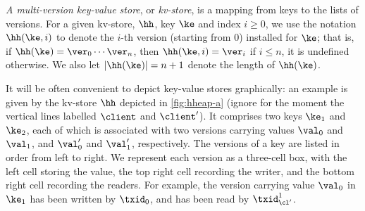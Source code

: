 \emph{A multi-version key-value store}, or \emph{kv-store}, 
is a mapping from keys to the lists of versions. 
For a given kv-store, $\hh$, key $\ke$ and index $i \geq 0$, we use the notation $\hh(\ke, i)$ 
to denote the $i$-th version (starting from $0$) installed for $\ke$; that is, if $\hh(\ke) = \ver_0 \cdots\ver_{n}$, then 
$\hh(\ke, i) = \ver_{i}$ if $i \leq n$, it is undefined otherwise. We also let $\lvert \hh(\ke) \rvert = n +1 $ denote 
the length of $\hh(\ke)$.

It will be often convenient to depict key-value stores graphically: an 
example is given by the kv-store $\hh$ depicted in \cref{fig:hheap-a}
(ignore for the moment the vertical lines labelled $\client$ and $\client'$). 
It comprises two keys \( \ke_1\) and \( \ke_2 \), 
each of which is associated with two versions carrying values $\val_0$ and $\val_1$, and $\val'_0$ and $\val'_1$, respectively.
The versions of a key are listed in order from left to right. 
We represent each version as a three-cell box, with the left cell storing the value, the top right cell recording the writer, and the bottom right cell recording the readers. 
For example, the version carrying value $\val_0$ in $\ke_1$ has been written by $\txid_0$, and has been read by $\txid_{\cl'}^1$.

